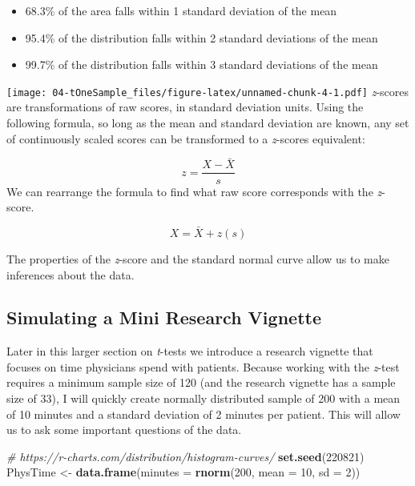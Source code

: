 \documentclass[
  11pt,
]{book}
\newenvironment{Shaded}{\begin{snugshade}}{\end{snugshade}}
\newcommand{\AttributeTok}[1]{\textcolor[rgb]{0.27,0.27,0.27}{#1}}
\newcommand{\CommentTok}[1]{\textcolor[rgb]{0.37,0.37,0.37}{\textit{#1}}}
\newcommand{\DecValTok}[1]{\textcolor[rgb]{0.06,0.06,0.06}{#1}}
\newcommand{\FunctionTok}[1]{\textcolor[rgb]{0.27,0.27,0.27}{\textbf{#1}}}
\newcommand{\NormalTok}[1]{#1}
\newcommand{\OtherTok}[1]{\textcolor[rgb]{0.37,0.37,0.37}{#1}}
\providecommand{\tightlist}{%
  \setlength{\itemsep}{0pt}\setlength{\parskip}{0pt}}
\begin{document}
\begin{itemize}
\tightlist
\item
  68.3\% of the area falls within 1 standard deviation of the mean
\item
  95.4\% of the distribution falls within 2 standard deviations of the mean
\item
  99.7\% of the distribution falls within 3 standard deviations of the mean
\end{itemize}

\texttt{[image: 04-tOneSample\_files/figure-latex/unnamed-chunk-4-1.pdf]} \emph{z}-scores are transformations of raw scores, in standard deviation units. Using the following formula, so long as the mean and standard deviation are known, any set of continuously scaled scores can be transformed to a \emph{z}-scores equivalent:

\[z=\frac{X-\bar{X}}{s}\] We can rearrange the formula to find what raw score corresponds with the \emph{z}-score.

\[X = \bar{X} + z(s)\]

The properties of the \emph{z}-score and the standard normal curve allow us to make inferences about the data.

\hypertarget{simulating-a-mini-research-vignette}{%
\subsection{Simulating a Mini Research Vignette}\label{simulating-a-mini-research-vignette}}

Later in this larger section on \emph{t}-tests we introduce a research vignette that focuses on time physicians spend with patients. Because working with the \emph{z}-test requires a minimum sample size of 120 (and the research vignette has a sample size of 33), I will quickly create normally distributed sample of 200 with a mean of 10 minutes and a standard deviation of 2 minutes per patient. This will allow us to ask some important questions of the data.

\begin{Shaded}
\begin{Highlighting}[]
\CommentTok{\# https://r{-}charts.com/distribution/histogram{-}curves/}
\FunctionTok{set.seed}\NormalTok{(}\DecValTok{220821}\NormalTok{)}
\NormalTok{PhysTime }\OtherTok{\textless{}{-}} \FunctionTok{data.frame}\NormalTok{(}\AttributeTok{minutes =} \FunctionTok{rnorm}\NormalTok{(}\DecValTok{200}\NormalTok{, }\AttributeTok{mean =} \DecValTok{10}\NormalTok{, }\AttributeTok{sd =} \DecValTok{2}\NormalTok{))}
\end{Highlighting}
\end{Shaded}
\end{document}
